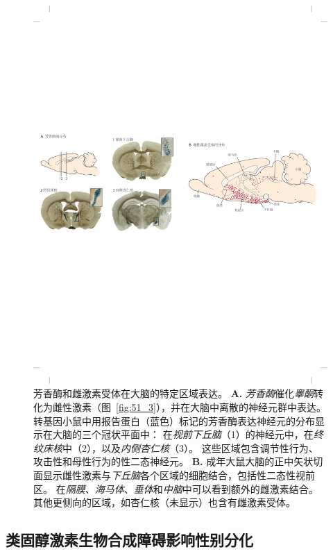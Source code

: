 \begin{figure}[htbp]
	\centering
	\includegraphics[width=1.0\linewidth]{chap51/fig_51_4}
	\caption{芳香酶和雌激素受体在大脑的特定区域表达。 
		\textbf{A.} \textit{芳香酶}催化\textit{睾酮}转化为雌性激素（图~\ref{fig:51_3}），并在大脑中离散的神经元群中表达。
		转基因小鼠中用报告蛋白（蓝色）标记的芳香酶表达神经元的分布显示在大脑的三个冠状平面中：
		在\textit{视前下丘脑}（1）的神经元中，在\textit{终纹床核}中（2），以及\textit{内侧杏仁核}（3）。
		这些区域包含调节性行为、攻击性和母性行为的性二态神经元\cite{wu2009estrogen}。
		\textbf{B.} 成年大鼠大脑的正中矢状切面显示雌性激素与\textit{下丘脑}各个区域的细胞结合，包括性二态性视前区。
		在\textit{隔膜}、\textit{海马体}、\textit{垂体}和\textit{中脑}中可以看到额外的雌激素结合。
		其他更侧向的区域，如杏仁核（未显示）也含有雌激素受体。}
	\label{fig:51_4}
\end{figure}



\subsection{类固醇激素生物合成障碍影响性别分化}

